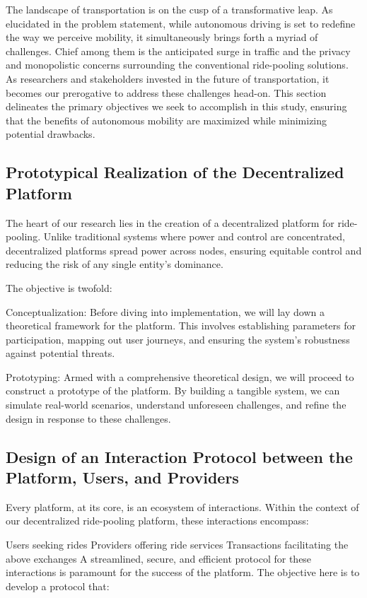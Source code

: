 The landscape of transportation is on the cusp of a transformative leap. As elucidated in the problem statement, while autonomous driving is set to redefine the way we perceive mobility, it simultaneously brings forth a myriad of challenges. Chief among them is the anticipated surge in traffic and the privacy and monopolistic concerns surrounding the conventional ride-pooling solutions. As researchers and stakeholders invested in the future of transportation, it becomes our prerogative to address these challenges head-on. This section delineates the primary objectives we seek to accomplish in this study, ensuring that the benefits of autonomous mobility are maximized while minimizing potential drawbacks.

\subsection{Prototypical Realization of the Decentralized Platform}

The heart of our research lies in the creation of a decentralized platform for ride-pooling. Unlike traditional systems where power and control are concentrated, decentralized platforms spread power across nodes, ensuring equitable control and reducing the risk of any single entity's dominance.

The objective is twofold:

Conceptualization: Before diving into implementation, we will lay down a theoretical framework for the platform. This involves establishing parameters for participation, mapping out user journeys, and ensuring the system's robustness against potential threats.

Prototyping: Armed with a comprehensive theoretical design, we will proceed to construct a prototype of the platform. By building a tangible system, we can simulate real-world scenarios, understand unforeseen challenges, and refine the design in response to these challenges.

\subsection{Design of an Interaction Protocol between the Platform, Users, and Providers}

Every platform, at its core, is an ecosystem of interactions. Within the context of our decentralized ride-pooling platform, these interactions encompass:

Users seeking rides
Providers offering ride services
Transactions facilitating the above exchanges
A streamlined, secure, and efficient protocol for these interactions is paramount for the success of the platform. The objective here is to develop a protocol that:

